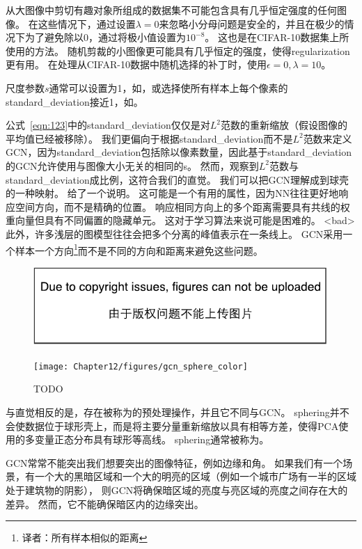从大图像中剪切有趣对象所组成的数据集不可能包含具有几乎恒定强度的任何图像。
在这些情况下，通过设置$\lambda = 0$来忽略小分母问题是安全的，并且在极少的情况下为了避免除以0，通过将极小值设置为$10^{-8}$。
这也是\citet{Goodfellow+al-arxiv-2013}在CIFAR-10数据集上所使用的方法。
随机剪裁的小图像更可能具有几乎恒定的强度，使得\gls{regularization}更有用。
在处理从CIFAR-10数据中随机选择的补丁时，\citet{Coates2011}使用$\epsilon = 0, \lambda = 10$。

尺度参数$s$通常可以设置为1，如\citet{Coates2011}，或选择使所有样本上每个像素的\gls{standard_deviation}接近1，如\citet{Goodfellow+al-arxiv-2013}。

公式~\eqref{eqn:123}中的\gls{standard_deviation}仅仅是对$L^2$范数的重新缩放（假设图像的平均值已经被移除）。
我们更偏向于根据\gls{standard_deviation}而不是$L^2$范数来定义\gls{GCN}，因为\gls{standard_deviation}包括除以像素数量，因此基于\gls{standard_deviation}的\gls{GCN}允许使用与图像大小无关的相同的s。
然而，观察到$L^2$范数与\gls{standard_deviation}成比例，这符合我们的直觉。
我们可以把\gls{GCN}理解成到球壳的一种映射。
给了一个说明。
这可能是一个有用的属性，因为\gls{NN}往往更好地响应空间方向，而不是精确的位置。
响应相同方向上的多个距离需要具有共线的权重向量但具有不同偏置的隐藏单元。
这对于学习算法来说可能是困难的。
<bad>此外，许多浅层的图模型往往会把多个分离的峰值表示在一条线上。
\gls{GCN}采用一个样本一个方向\footnote{译者：所有样本相似的距离}而不是不同的方向和距离来避免这些问题。

\begin{figure}[!htb]
\ifOpenSource
\centerline{\includegraphics{figure.pdf}}
\else
	\centerline{\texttt{[image: Chapter12/figures/gcn\_sphere\_color]}}
\fi
	\caption{TODO}
	\label{fig:gcn_sphere_color}
\end{figure}


与直觉相反的是，存在被称为的预处理操作，并且它不同与\gls{GCN}。
\gls{sphering}并不会使数据位于球形壳上，而是将主要分量重新缩放以具有相等方差，使得\gls{PCA}使用的多变量正态分布具有球形等高线。 
\gls{sphering}通常被称为。


\gls{GCN}常常不能突出我们想要突出的图像特征，例如边缘和角。
如果我们有一个场景，有一个大的黑暗区域和一个大的明亮的区域（例如一个城市广场有一半的区域处于建筑物的阴影），
则\gls{GCN}将确保暗区域的亮度与亮区域的亮度之间存在大的差异。
然而，它不能确保暗区内的边缘突出。

